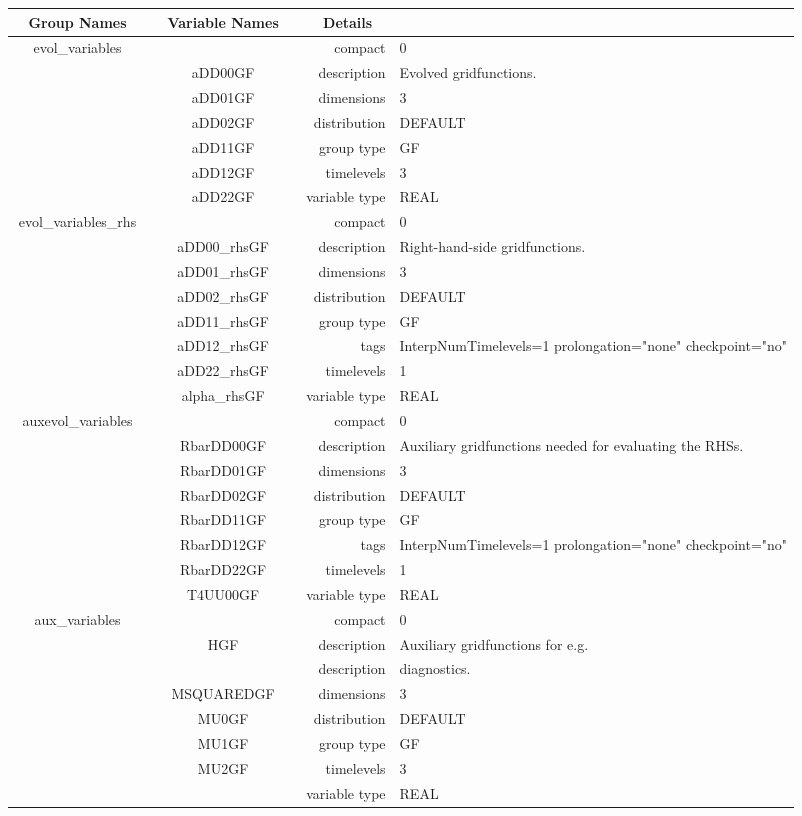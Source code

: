 \begin{tabular*}{150mm}{|c|c@{\extracolsep{\fill}}|rl|} \hline 
~ {\bf Group Names} ~ & ~ {\bf Variable Names} ~  &{\bf Details} ~ & ~\\ 
\hline 
evol\_variables &  & compact & 0 \\ 
 & aDD00GF & description & Evolved gridfunctions. \\ 
 & aDD01GF & dimensions & 3 \\ 
 & aDD02GF & distribution & DEFAULT \\ 
 & aDD11GF & group type & GF \\ 
 & aDD12GF & timelevels & 3 \\ 
 & aDD22GF & variable type & REAL \\ 
\hline 
evol\_variables\_rhs &  & compact & 0 \\ 
 & aDD00\_rhsGF & description & Right-hand-side gridfunctions. \\ 
 & aDD01\_rhsGF & dimensions & 3 \\ 
 & aDD02\_rhsGF & distribution & DEFAULT \\ 
 & aDD11\_rhsGF & group type & GF \\ 
 & aDD12\_rhsGF & tags & InterpNumTimelevels=1 prolongation="none" checkpoint="no" \\ 
 & aDD22\_rhsGF & timelevels & 1 \\ 
 & alpha\_rhsGF & variable type & REAL \\ 
\hline 
auxevol\_variables &  & compact & 0 \\ 
 & RbarDD00GF & description & Auxiliary gridfunctions needed for evaluating the RHSs. \\ 
 & RbarDD01GF & dimensions & 3 \\ 
 & RbarDD02GF & distribution & DEFAULT \\ 
 & RbarDD11GF & group type & GF \\ 
 & RbarDD12GF & tags & InterpNumTimelevels=1 prolongation="none" checkpoint="no" \\ 
 & RbarDD22GF & timelevels & 1 \\ 
 & T4UU00GF & variable type & REAL \\ 
\hline 
aux\_variables &  & compact & 0 \\ 
 & HGF & description & Auxiliary gridfunctions for e.g. \\ 
& ~ & description &  diagnostics. \\ 
 & MSQUAREDGF & dimensions & 3 \\ 
 & MU0GF & distribution & DEFAULT \\ 
 & MU1GF & group type & GF \\ 
 & MU2GF & timelevels & 3 \\ 
 &  & variable type & REAL \\ 
\hline 
\end{tabular*} 



